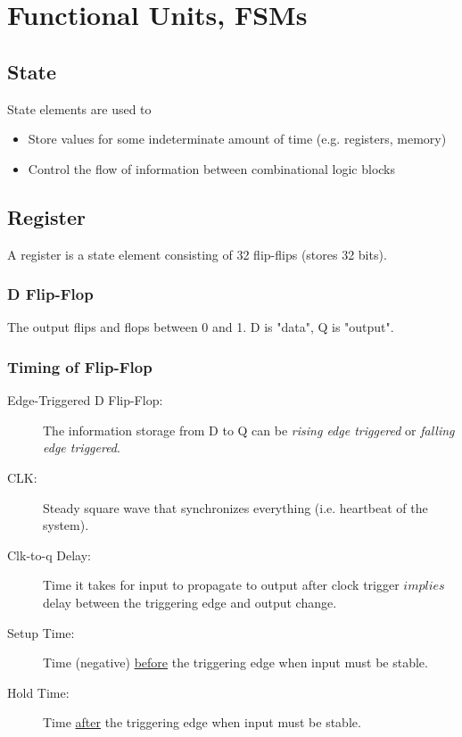 \chapter{Functional Units, FSMs}

\section{State}
State elements are used to
\begin{itemize}
    \item Store values for some indeterminate amount of time (e.g. registers, memory) 
    \item Control the flow of information between combinational logic blocks
\end{itemize}

\section{Register}
A register is a state element consisting of 32 flip-flips (stores 32 bits).

\subsection{D Flip-Flop}
The output flips and flops between 0 and 1. D is "data", Q is "output".

\subsection{Timing of Flip-Flop}
\begin{description}
    \item[Edge-Triggered D Flip-Flop:] The information storage from D to Q can be \emph{rising edge triggered} or \emph{falling edge triggered}.
    
    \item[CLK:]  Steady square wave that synchronizes everything (i.e. heartbeat of the system).
    
    \item[Clk-to-q Delay:] Time it takes for input to propagate to output after clock trigger $implies$ delay between the triggering edge and output change.
    
    \item[Setup Time:] Time (negative) \underline{before} the triggering edge when input must be stable.
    
    \item[Hold Time:] Time \underline{after} the triggering edge when input must be stable.
\end{description}

